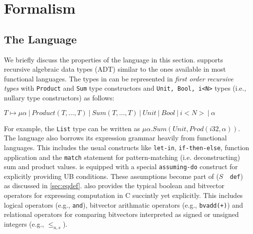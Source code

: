\section{Formalism}
\label{sec:formalism}
\subsection{The \SpecL{} Language}
\label{sec:speclang}
We briefly discuss the properties of the \SpecL{} language in this section.
\SpecL{} supports recursive algebraic data types (ADT) similar to the ones available in most functional languages.
The types in \SpecL{} can be represented in {\em first order recursive types} with {\tt Product} and {\tt Sum}
type constructors and {\tt Unit, Bool, i<N>} types (i.e., nullary type constructors) as follows:

$T \mapsto \mu \alpha \ |\  Product(T,\dots,T) \ |\  Sum(T,\dots,T) \ |\  Unit \ |\  Bool \ |\  i<N> \ |\  \alpha$

For example, the {\tt List} type can be written as $\mu \alpha. Sum(Unit, Prod(i32,\alpha))$.
The language also borrows its expression grammar heavily from functional languages.
This includes the usual constructs like {\tt let-in}, {\tt if-then-else}, function application and the {\tt match} statement
for pattern-matching (i.e. deconstructing) sum and product values.
\SpecL{} is equipped with a special {\tt assuming-do} construct for explicitly providing UB conditions.
These assumptions become part of ($S$\ \ {\tt def}) as discussed in \cref{sec:eqdef}.
\SpecL{} also provides the typical boolean and bitvector operators for expressing computation in C succintly yet explicitly.
This includes logical operators (e.g., {\tt and}), bitvector arithmatic operators (e.g., {\tt bvadd(+)}) and
relational operators for comparing bitvectors interpreted as signed or unsigned integers (e.g., {\tt $\leq_{u,s}$}).

